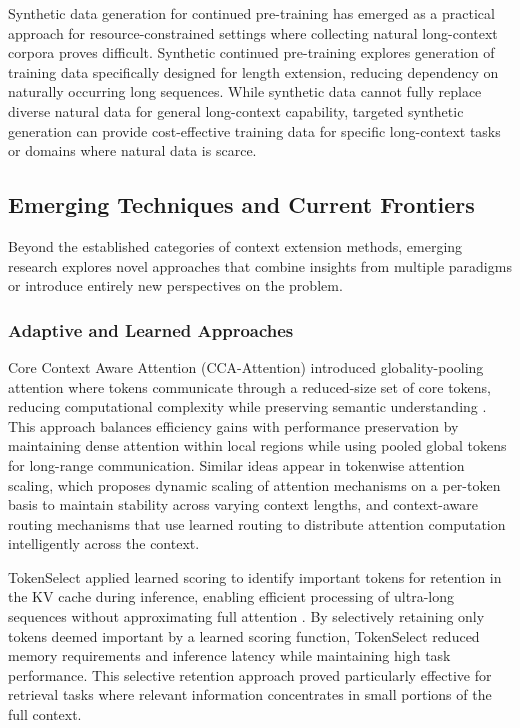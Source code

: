 Synthetic data generation for continued pre-training has emerged as a practical approach for resource-constrained settings where collecting natural long-context corpora proves difficult. Synthetic continued pre-training explores generation of training data specifically designed for length extension, reducing dependency on naturally occurring long sequences. While synthetic data cannot fully replace diverse natural data for general long-context capability, targeted synthetic generation can provide cost-effective training data for specific long-context tasks or domains where natural data is scarce.

\subsection{Emerging Techniques and Current Frontiers}

Beyond the established categories of context extension methods, emerging research explores novel approaches that combine insights from multiple paradigms or introduce entirely new perspectives on the problem.

\subsubsection{Adaptive and Learned Approaches}

Core Context Aware Attention (CCA-Attention) introduced globality-pooling attention where tokens communicate through a reduced-size set of core tokens, reducing computational complexity while preserving semantic understanding \citep{zhang2024core}. This approach balances efficiency gains with performance preservation by maintaining dense attention within local regions while using pooled global tokens for long-range communication. Similar ideas appear in tokenwise attention scaling, which proposes dynamic scaling of attention mechanisms on a per-token basis to maintain stability across varying context lengths, and context-aware routing mechanisms that use learned routing to distribute attention computation intelligently across the context.

TokenSelect applied learned scoring to identify important tokens for retention in the KV cache during inference, enabling efficient processing of ultra-long sequences without approximating full attention \citep{jiang2025tokenselect}. By selectively retaining only tokens deemed important by a learned scoring function, TokenSelect reduced memory requirements and inference latency while maintaining high task performance. This selective retention approach proved particularly effective for retrieval tasks where relevant information concentrates in small portions of the full context.

